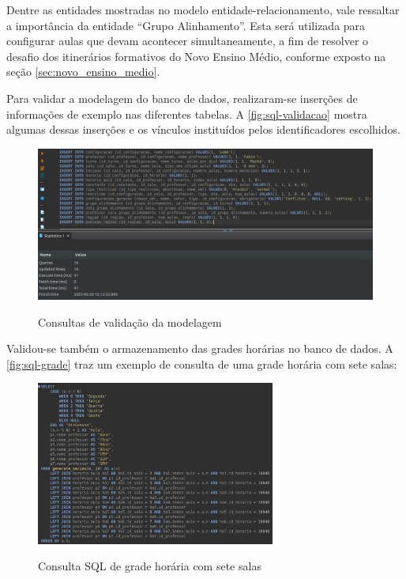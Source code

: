 Dentre as entidades mostradas no modelo entidade-relacionamento, vale ressaltar a importância da entidade ``Grupo Alinhamento''. Esta será utilizada para configurar aulas que devam acontecer simultaneamente, a fim de resolver o desafio dos itinerários formativos do Novo Ensino Médio, conforme exposto na seção \ref{sec:novo_ensino_medio}.

Para validar a modelagem do banco de dados, realizaram-se inserções de informações de exemplo nas diferentes tabelas. A \autoref{fig:sql-validacao} mostra algumas dessas inserções e os vínculos instituídos pelos identificadores escolhidos.

\begin{figure}[!htb]
	\centering
	\caption{Consultas de validação da modelagem}
	\includegraphics[width=1\textwidth]{./dados/figuras/sql_validacao}
	\label{fig:sql-validacao}
\end{figure}
\newpage

Validou-se também o armazenamento das grades horárias no banco de dados. A \autoref{fig:sql-grade} traz um exemplo de consulta de uma grade horária com sete salas:

\begin{figure}[!htb]
	\centering
	\caption{Consulta SQL de grade horária com sete salas}
	\includegraphics[width=0.7\textwidth]{./dados/figuras/sql_grade}
	\label{fig:sql-grade}
\end{figure}

